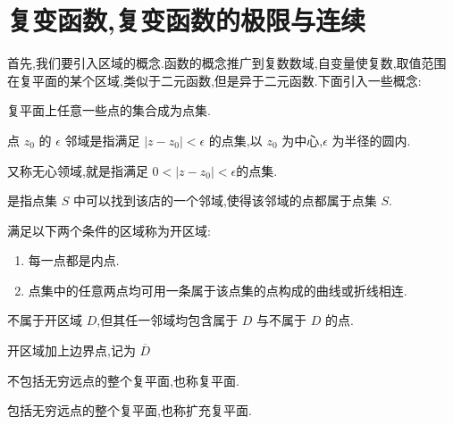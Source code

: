 \documentclass[UTF8]{ctexbook}
\begin{document}
\section{复变函数,复变函数的极限与连续}

首先,我们要引入区域的概念.函数的概念推广到复数数域,自变量使复数,取值范围在复平面的某个区域,类似于二元函数,但是异于二元函数.下面引入一些概念:

\begin{definition}
    复平面上任意一些点的集合成为点集.
\end{definition}

\begin{definition}
    点 $z_0$ 的 $\epsilon$ 邻域是指满足 $|z-z_0| < \epsilon$ 的点集,以 $z_0$ 为中心,$\epsilon$ 为半径的圆内.
\end{definition}

\begin{definition}[去心邻域]
    又称无心领域,就是指满足 $0<|z-z_0|<\epsilon$的点集.
\end{definition}

\begin{definition}[内点]
    是指点集 $S$ 中可以找到该店的一个邻域,使得该邻域的点都属于点集 $S$.
\end{definition}

\begin{definition}[开区域]
    满足以下两个条件的区域称为开区域:
    \begin{enumerate}
        \item 每一点都是内点.
        \item 点集中的任意两点均可用一条属于该点集的点构成的曲线或折线相连.
    \end{enumerate}
\end{definition}

\begin{definition}[边界点]
    不属于开区域 $D$,但其任一邻域均包含属于 $D$ 与不属于 $D$ 的点.
\end{definition}

\begin{definition}
    开区域加上边界点,记为 $\overline{D}$
\end{definition}

\begin{definition}[全平面]
    不包括无穷远点的整个复平面,也称复平面.
\end{definition}

\begin{definition}[闭平面]
    包括无穷远点的整个复平面,也称扩充复平面.
\end{definition}
\end{document}

